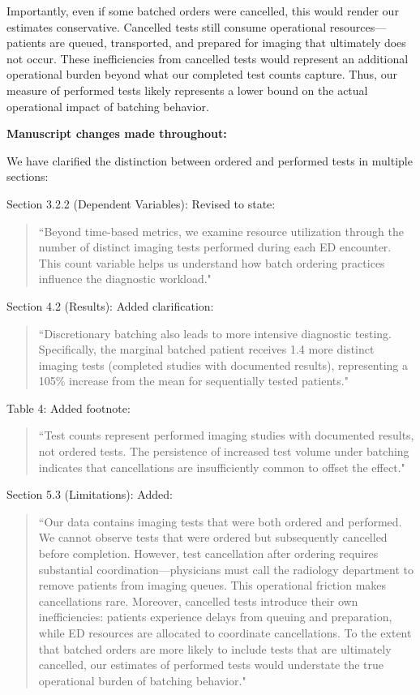 \documentclass[11pt]{article}
\newcommand{\1}{\hbox{\rm 1\kern-.35em 1}}
\begin{document}
{{Importantly, even if some batched orders were cancelled, this would render our estimates conservative. Cancelled tests still consume operational resources—patients are queued, transported, and prepared for imaging that ultimately does not occur. These inefficiencies from cancelled tests would represent an additional operational burden beyond what our completed test counts capture. Thus, our measure of performed tests likely represents a lower bound on the actual operational impact of batching behavior.

\textbf{Manuscript changes made throughout:}

We have clarified the distinction between ordered and performed tests in multiple sections:

Section 3.2.2 (Dependent Variables): Revised to state: 
\begin{quote}
``Beyond time-based metrics, we examine resource utilization through the number of distinct imaging tests performed during each ED encounter. This count variable helps us understand how batch ordering practices influence the diagnostic workload."
\end{quote}

Section 4.2 (Results): Added clarification: 
\begin{quote}
``Discretionary batching also leads to more intensive diagnostic testing. Specifically, the marginal batched patient receives 1.4 more distinct imaging tests (completed studies with documented results), representing a 105\% increase from the mean for sequentially tested patients."
\end{quote}

Table 4: Added footnote: 
\begin{quote}
``Test counts represent performed imaging studies with documented results, not ordered tests. The persistence of increased test volume under batching indicates that cancellations are insufficiently common to offset the  effect."
\end{quote}

Section 5.3 (Limitations): Added: 
\begin{quote}
``Our data contains imaging tests that were both ordered and performed. We cannot observe tests that were ordered but subsequently cancelled before completion. However, test cancellation after ordering requires substantial coordination—physicians must call the radiology department to remove patients from imaging queues. This operational friction makes cancellations rare. Moreover, cancelled tests introduce their own inefficiencies: patients experience delays from queuing and preparation, while ED resources are allocated to coordinate cancellations. To the extent that batched orders are more likely to include tests that are ultimately cancelled, our estimates of performed tests would understate the true operational burden of batching behavior."
\end{quote}

}}
\end{document}
